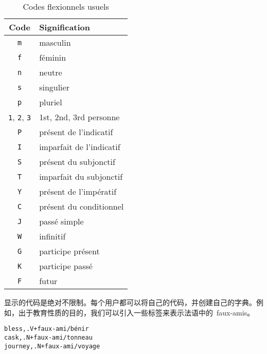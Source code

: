\begin{table}[!h]
\begin{center}
\begin{tabular}{|c|l|}
\hline
\textbf{Code} & \textbf{Signification} \\
\hline
\verb+m+ & masculin \\
\hline
\verb+f+ & féminin \\
\hline
\verb+n+ & neutre \\
\hline
\verb+s+ & singulier \\
\hline
\verb+p+ & pluriel \\
\hline
\verb+1+, \verb+2+, \verb+3+ & 1st, 2nd, 3rd personne\\
\hline
\verb+P+ & présent de l’indicatif \\
\hline
\verb+I+ & imparfait de l’indicatif  \\
\hline
\verb+S+ & présent du subjonctif\\
\hline
\verb+T+ & imparfait du subjonctif \\
\hline
\verb+Y+ & présent de l’impératif \\
\hline
\verb+C+ & présent du conditionnel\\
\hline
\verb+J+ & passé simple \\
\hline
\verb+W+ & infinitif \\
\hline
\verb+G+ & participe présent \\
\hline
\verb+K+ & participe passé \\
\hline
\verb+F+ & futur \\
\hline
\end{tabular}
\caption{Codes flexionnels usuels\label{tab-inflectional-codes}}
\end{center}
\end{table}


\bigskip
\noindent 显示的代码是绝对不限制。每个用户都可以将自己的代码，并创建自己的字典。例如，出于教育性质的目的，我们可以引入一些标签来表示法语中的\ faux-amis。

\bigskip
\begin{verbatim}
bless,.V+faux-ami/bénir
cask,.N+faux-ami/tonneau
journey,.N+faux-ami/voyage
\end{verbatim}

